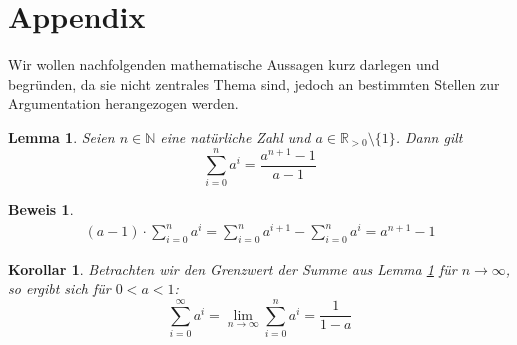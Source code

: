 \documentclass[a4paper]{article}
\newtheorem{korollar}[satz]{Korollar}
\newtheorem{lemma}[satz]{Lemma}
\theoremstyle{nonumberplain}
\newtheorem{beweis}{Beweis}
\begin{document}
\begin{comment}
	\addplot[ only marks,color=blue,mark=square,name path=f]
	coordinates {
		(33,0.2166)(95,0.4558)(210,0.8892)(397,1.5893)(674,2.6494)(1570,6.4088)(76,0.4086)(354,1.6069)(1067,4.5743)(2557,11.1483)(5257,27.398)(16495,81.2725)(172,0.8519)(1292,6.237)(5267,25.332)(15833,76.5412)(39158,194.1443)(164288,879.2178)(398,1.9171)(4487,22.1102)(24979,130.9343)(94408,510.1477)(280865,1570.9472)
	};
	
	\addplot[only marks,color=red,mark=triangle,name path=f]
	coordinates {
		(28,0.0228)(244,0.2634)(2188,1.3599)(19684,14.4951)(177148,173.7169)(1594324,2145.145)(14348908,35305.0664)
	};
	
	\addlegendentry{leader\_sync}
	\addlegendentry{herman}
	\end{axis}
	\end{tikzpicture}
\end{figure}
\end{comment}
\section{Appendix}

Wir wollen nachfolgenden mathematische Aussagen kurz darlegen und begründen, da sie nicht zentrales Thema sind, jedoch an bestimmten Stellen zur Argumentation herangezogen werden.

\begin{lemma} \label{lem-geosum}
	Seien $n \in \mathbb{N}$ eine natürliche Zahl und $a \in \mathbb{R}_{>0}\setminus\{1\}$. Dann gilt
\begin{equation}
\sum_{i=0}^{n}{a^i} = \frac{a^{n+1}-1}{a-1}
\end{equation}
\end{lemma}
\begin{beweis}
\begin{align*}
	(a-1) \cdot \sum_{i=0}^{n}{a^i} = \sum_{i=0}^{n}{a^{i+1}} - \sum_{i=0}^{n}{a^i} = a^{n+1} - 1
\end{align*}
\end{beweis}

\begin{korollar} \label{kor-geosum}
Betrachten wir den Grenzwert der Summe aus Lemma \ref{lem-geosum} für $n \to \infty$, so ergibt sich für $0<a<1$:
\begin{equation}
\sum_{i=0}^{\infty}{a^i}
= \lim\limits_{n \to \infty} \sum_{i=0}^{n}{a^i}
= \frac{1}{1-a}
\end{equation}
\end{korollar}
\end{document}
